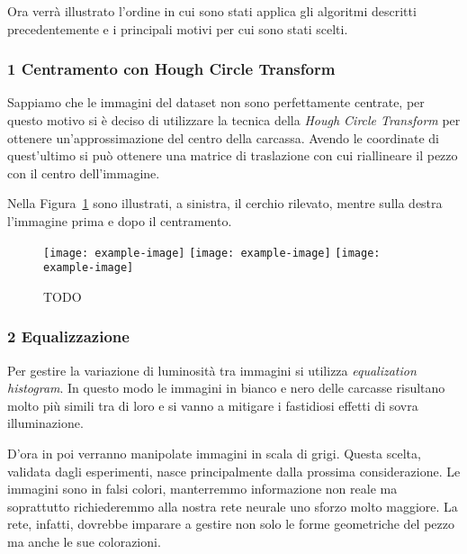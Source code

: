 \clearpage
Ora verrà illustrato l'ordine in cui sono stati applica gli algoritmi descritti precedentemente e i principali motivi per cui sono stati scelti.

\subsubsection{1 Centramento con Hough Circle Transform}
Sappiamo che le immagini del dataset non sono perfettamente centrate, per questo motivo si è deciso di utilizzare la tecnica della \textit{Hough Circle Transform} per ottenere un'approssimazione del centro della carcassa.
Avendo le coordinate di quest'ultimo si può ottenere una matrice di traslazione con cui riallineare il pezzo con il centro dell'immagine.

Nella Figura~\ref{fig:centramento} sono illustrati, a sinistra, il cerchio rilevato, mentre sulla destra l'immagine prima e dopo il centramento.
\begin{figure}[ht] %
  \begin{center}
    \texttt{[image: example-image]}
    \texttt{[image: example-image]}
    \texttt{[image: example-image]}
    \caption{TODO }
    \label{fig:centramento}
  \end{center}
\end{figure}

\subsubsection{2 Equalizzazione}
Per gestire la variazione di luminosità tra immagini si utilizza \textit{equalization histogram}.
In questo modo le immagini in bianco e nero delle carcasse risultano molto più simili tra di loro e si vanno a mitigare i fastidiosi effetti di sovra illuminazione.

D'ora in poi verranno manipolate immagini in scala di grigi.
Questa scelta, validata dagli esperimenti, nasce principalmente dalla prossima considerazione.
Le immagini sono in falsi colori, manterremmo informazione non reale ma soprattutto richiederemmo alla nostra rete neurale uno sforzo molto maggiore.
La rete, infatti, dovrebbe imparare a gestire non solo le forme geometriche del pezzo ma anche le sue colorazioni.

